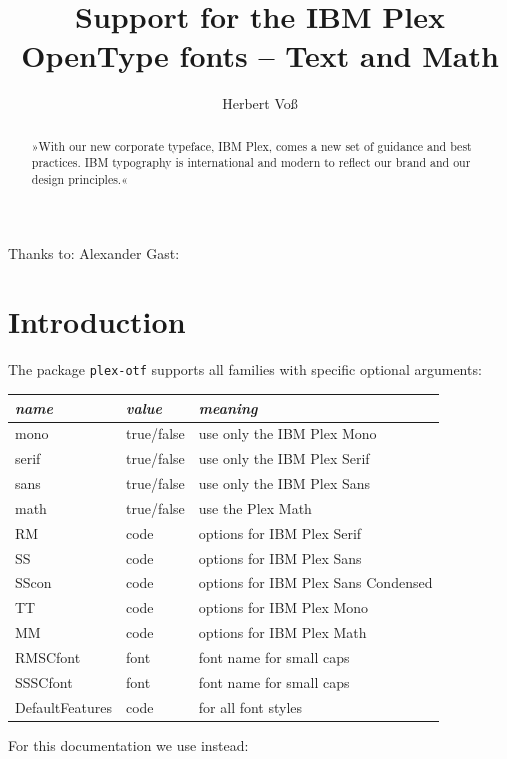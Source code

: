 \documentclass[fontsize=11pt,paper=a4,twoside=on,abstract=on,usegeometry]{scrartcl}
\title{Support for the IBM Plex OpenType fonts -- Text and Math}
\author{Herbert Voß}
\begin{document}
\maketitle
\tableofcontents

\begin{abstract}
»With our new corporate typeface, IBM Plex, comes a new set of guidance and best practices. 
IBM typography is international and modern to reflect our brand and our design principles.«~\cite{git}
\end{abstract}

\vfill
Thanks to: Alexander Gast:

\newpage

\section{Introduction}


The package \texttt{plex-otf} supports all families with specific optional
arguments:




\begin{tabular}{@{} >{\ttfamily}l l l @{}}\\\toprule
\emph{name} & \emph{value} &\emph{meaning}\\\midrule
mono & true/false & use only the IBM Plex Mono\\
serif & true/false & use only the IBM Plex Serif\\
sans & true/false & use only the IBM Plex Sans\\
math & true/false & use the Plex Math \\
RM & code & options for IBM Plex Serif\\
SS & code &  options for IBM Plex Sans\\
SScon & code &  options for IBM Plex Sans Condensed\\
TT & code &  options for IBM Plex Mono\\
MM & code &  options for IBM Plex Math\\
RMSCfont  & font & font name for small caps\\
SSSCfont  & font & font name for small caps\\
DefaultFeatures & code &  for all font styles\\\bottomrule
\end{tabular}

\bigskip
For this documentation
we use instead:
\end{document}
